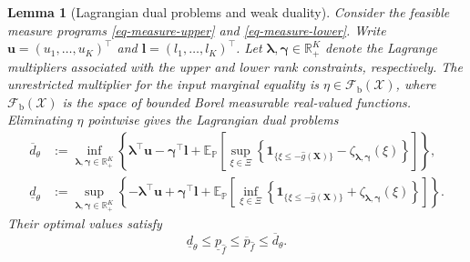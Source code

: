\documentclass[review,11pt,3p,authoryear,nopreprintline]{elsarticle}
\newtheorem{lemma}{Lemma}
\begin{document}
\begin{lemma}[Lagrangian dual problems and weak duality]
  \label{lem-weak-duality}
  Consider the feasible measure programs \eqref{eq-measure-upper} and \eqref{eq-measure-lower}. Write $\bm u=(u_1,\ldots,u_K)^\top$ and $\bm l=(l_1,\ldots,l_K)^\top$. Let $\bm\lambda,\bm\gamma\in\mathbb R_+^K$ denote the Lagrange multipliers associated with the upper and lower rank constraints, respectively. The unrestricted multiplier for the input marginal equality is $\eta\in\mathcal F_{\mathrm b}(\mathcal X)$, where $\mathcal F_{\mathrm b}(\mathcal X)$ is the space of bounded Borel measurable real-valued functions. Eliminating $\eta$ pointwise gives the Lagrangian dual problems
  \begin{align}
    \overline d_\theta
    &:=\inf_{\bm\lambda,\bm\gamma\in\mathbb R_+^K}
    \left\{\bm\lambda^\top\bm u-\bm\gamma^\top\bm l
    +\mathbb E_{\mathbb P}\left[\sup_{\xi\in\Xi}\left\{
    \mathbf1_{\{\xi\le-\hat g(\bm X)\}}
    -\zeta_{\bm\lambda,\bm\gamma}(\xi)
    \right\}\right]\right\},
    \label{eq-upper-measure-dual}\\
    \underline d_\theta
    &:=\sup_{\bm\lambda,\bm\gamma\in\mathbb R_+^K}
    \left\{-\bm\lambda^\top\bm u+\bm\gamma^\top\bm l
    +\mathbb E_{\mathbb P}\left[\inf_{\xi\in\Xi}\left\{
    \mathbf1_{\{\xi\le-\hat g(\bm X)\}}
    +\zeta_{\bm\lambda,\bm\gamma}(\xi)
    \right\}\right]\right\}.
    \label{eq-lower-measure-dual}
  \end{align}
  Their optimal values satisfy
  \begin{equation}
    \underline d_\theta\le\underline p_{\hat f}
    \le\overline p_{\hat f}\le\overline d_\theta.
    \label{eq-weak-duality}
  \end{equation}
\end{lemma}
\end{document}
